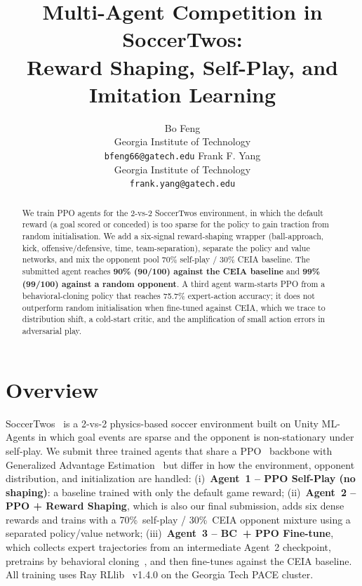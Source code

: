 \documentclass{article}
\title{Multi-Agent Competition in SoccerTwos:\\Reward Shaping, Self-Play, and Imitation Learning}
\author{
  Bo Feng\\
  Georgia Institute of Technology\\
  \texttt{bfeng66@gatech.edu}
  \And
  Frank F. Yang\\
  Georgia Institute of Technology\\
  \texttt{frank.yang@gatech.edu}
}
\begin{document}
\maketitle

\begin{abstract}
We train PPO agents for the 2-vs-2 SoccerTwos environment, in which the default
reward (a goal scored or conceded) is too sparse for the policy to gain traction
from random initialisation. We add a six-signal reward-shaping wrapper
(ball-approach, kick, offensive/defensive, time, team-separation), separate the
policy and value networks, and mix the opponent pool 70\% self-play / 30\% CEIA
baseline. The submitted agent reaches \textbf{90\% (90/100) against the CEIA
baseline} and \textbf{99\% (99/100) against a random opponent}. A third agent
warm-starts PPO from a behavioral-cloning policy that reaches 75.7\%
expert-action accuracy; it does not outperform random initialisation when
fine-tuned against CEIA, which we trace to distribution shift, a cold-start
critic, and the amplification of small action errors in adversarial play.
\end{abstract}


\section{Overview}
\label{sec:overview}

SoccerTwos~\citep{soccertwos} is a 2-vs-2 physics-based soccer environment built
on Unity ML-Agents in which goal events are sparse and the opponent is non-stationary
under self-play. We submit three trained agents that share a PPO~\citep{schulman2017ppo}
backbone with Generalized Advantage Estimation~\citep{schulman2016gae} but differ in
how the environment, opponent distribution, and initialization are handled:
(i)~\textbf{Agent~1 -- PPO Self-Play (no shaping)}: a baseline trained with only the
default game reward; (ii)~\textbf{Agent~2 -- PPO + Reward Shaping}, which is also our
final submission, adds six dense rewards and trains with a 70\%~self-play / 30\%~CEIA
opponent mixture using a separated policy/value network; (iii)~\textbf{Agent~3 --
BC~+ PPO Fine-tune}, which collects expert trajectories
from an intermediate Agent~2 checkpoint, pretrains by behavioral
cloning~\citep{pomerleau1991bc}, and then fine-tunes against the CEIA baseline. All
training uses Ray RLlib~\citep{liang2018rllib} v1.4.0 on the Georgia Tech PACE cluster.
\end{document}
